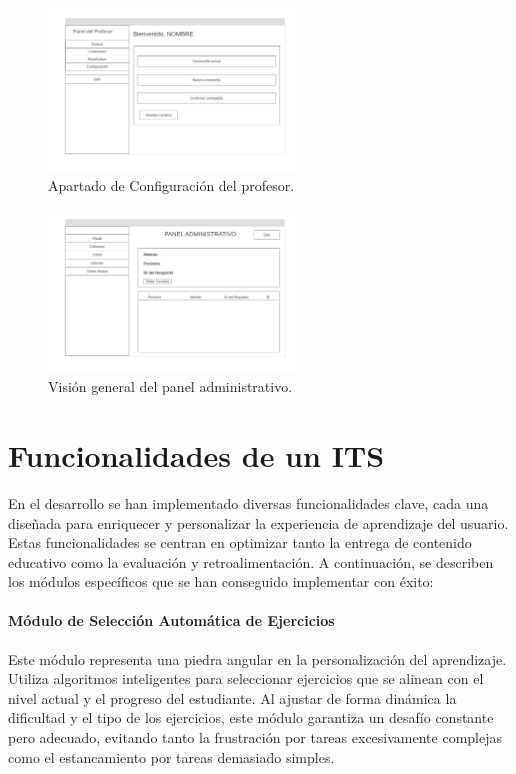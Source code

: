 \begin{figure}[H]
    \centering
    \includegraphics[width=0.6\textwidth]{imagenes/Mockups/15-Profesor-Configuracion.png}
    \caption{Apartado de Configuración del profesor.}
\end{figure}

\begin{figure}[H]
    \centering
    \includegraphics[width=0.6\textwidth]{imagenes/Mockups/16-Panel-Administrativo.png}
    \caption{Visión general del panel administrativo.}
\end{figure}

\section{Funcionalidades de un ITS}

En el desarrollo se han implementado diversas funcionalidades clave, cada una diseñada para enriquecer y personalizar la experiencia de aprendizaje del usuario. Estas funcionalidades se centran en optimizar tanto la entrega de contenido educativo como la evaluación y retroalimentación. A continuación, se describen los módulos específicos que se han conseguido implementar con éxito:

\paragraph{Módulo de Selección Automática de Ejercicios}

Este módulo representa una piedra angular en la personalización del aprendizaje. Utiliza algoritmos inteligentes para seleccionar ejercicios que se alinean con el nivel actual y el progreso del estudiante. Al ajustar de forma dinámica la dificultad y el tipo de los ejercicios, este módulo garantiza un desafío constante pero adecuado, evitando tanto la frustración por tareas excesivamente complejas como el estancamiento por tareas demasiado simples.

